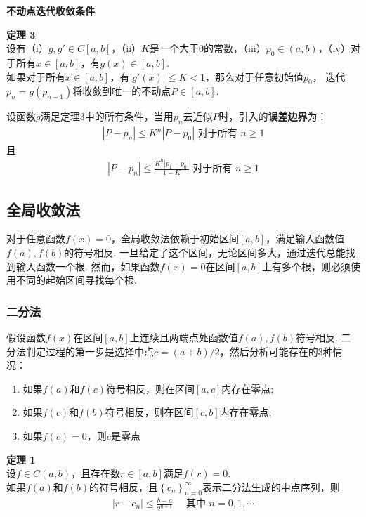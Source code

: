 \documentclass[UTF8]{ctexart}
\newenvironment{dingli}[2][定理]
{\begin{mdframed}[backgroundcolor=gray!20] \textbf{#1 #2} \\}
	{\end{mdframed}}
\begin{document}
\textbf{不动点迭代收敛条件}
\begin{dingli}{3}
	设有（i）$g,g'\in C[a,b]$，（ii）$K$是一个大于0的常数，（iii）$p_{0} \in (a,b)$，（iv）对于所有$x \in [a,b]$，有$g(x) \in [a,b]$.\\
	如果对于所有$x \in [a,b]$，有$|g'(x)| \leqslant K < 1$，那么对于任意初始值$p_{0}$， 迭代$p_{n}=g(p_{n-1})$将收敛到唯一的不动点$P \in [a,b]$.
\end{dingli}


设函数$g$满足定理3中的所有条件，当用$p_{n}$去近似$P$时，引入的\textbf{误差边界}为：
\begin{align}
	\left|P-p_{n}\right| \leqslant K^{n}\left|P-p_{0}\right| \text { 对于所有 } n \geqslant 1
\end{align}
\qquad 且
\begin{align}
	\left|P-p_{n}\right| \leqslant \frac{K^{n}\left|p_{1}-p_{0}\right|}{1-K} \text { 对于所有 } n \geqslant 1
\end{align}

\subsection{全局收敛法}
对于任意函数$f(x)=0$，全局收敛法依赖于初始区间$[a,b]$，满足输入函数值$f(a), f(b)$的符号相反. 一旦给定了这个区间，无论区间多大，通过迭代总能找到输入函数一个根.
然而，如果函数$f(x)=0$在区间$[a,b]$上有多个根，则必须使用不同的起始区间寻找每个根.

\subsubsection{二分法}
假设函数$f(x)$在区间$[a,b]$上连续且两端点处函数值$f(a), f(b)$符号相反.
二分法判定过程的第一步是选择中点$c=(a+b)/2$，然后分析可能存在的3种情况：
\begin{enumerate}
	\item 如果$f(a)$和$f(c)$符号相反，则在区间$[a,c]$内存在零点;
	\item 如果$f(c)$和$f(b)$符号相反，则在区间$[c,b]$内存在零点;
	\item 如果$f(c)=0$，则$c$是零点
\end{enumerate}

\begin{dingli}{1}
	设$f \in C(a,b)$，且存在数$r \in [a,b]$满足$f(r)=0$.\\
	如果$f(a)$和$f(b)$的符号相反，且$\left\{c_{n}\right\}_{n=0}^{\infty}$表示二分法生成的中点序列，则
	\begin{align}
		\left|r-c_{n}\right| \leqslant \frac{b-a}{2^{n+1}} \quad \text { 其中 } n=0,1, \cdots
	\end{align}
\end{dingli}
\end{document}
